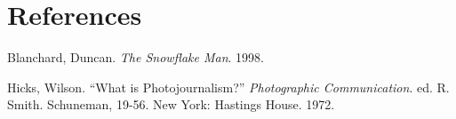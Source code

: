 \section*{References}

\bibent Blanchard, Duncan. \textit{The Snowflake Man}. 1998.

\bibent Hicks, Wilson. ``What is Photojournalism?''  \textit{Photographic
Communication}.  ed. R. Smith.  Schuneman, 19-56. New York: Hastings House. 1972.
